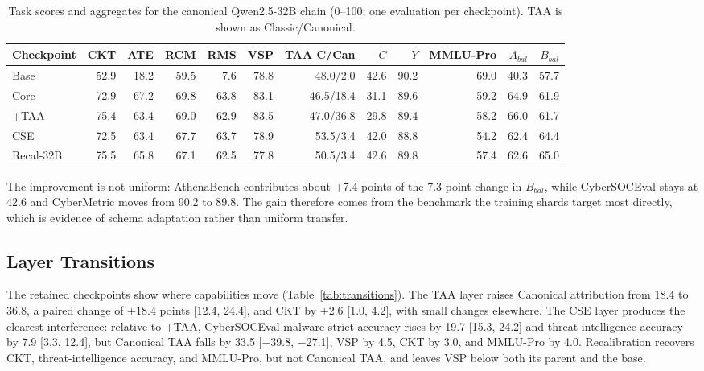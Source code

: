 \documentclass[conference]{IEEEtran}
\begin{document}
\begin{table}[t]
\caption{Task scores and aggregates for the canonical Qwen2.5-32B chain (0--100; one evaluation per checkpoint). TAA is shown as Classic/Canonical.}
\label{tab:mainresults}
\centering
\footnotesize
\setlength{\tabcolsep}{3.0pt}
\begin{tabular}{@{}lrrrrrrrrrrr@{}}
\toprule
Checkpoint & CKT & ATE & RCM & RMS & VSP & TAA C/Can & $C$ & $Y$ & MMLU-Pro & $A_{bal}$ & $B_{bal}$ \\
\midrule
Base & 52.9 & 18.2 & 59.5 & 7.6 & 78.8 & 48.0/2.0 & 42.6 & 90.2 & 69.0 & 40.3 & 57.7 \\
Core & 72.9 & 67.2 & 69.8 & 63.8 & 83.1 & 46.5/18.4 & 31.1 & 89.6 & 59.2 & 64.9 & 61.9 \\
+TAA & 75.4 & 63.4 & 69.0 & 62.9 & 83.5 & 47.0/36.8 & 29.8 & 89.4 & 58.2 & 66.0 & 61.7 \\
CSE & 72.5 & 63.4 & 67.7 & 63.7 & 78.9 & 53.5/3.4 & 42.0 & 88.8 & 54.2 & 62.4 & 64.4 \\
Recal-32B & 75.5 & 65.8 & 67.1 & 62.5 & 77.8 & 50.5/3.4 & 42.6 & 89.8 & 57.4 & 62.6 & 65.0 \\
\bottomrule
\end{tabular}
\end{table}

The improvement is not uniform: AthenaBench contributes about +7.4 points of the 7.3-point change in $B_{bal}$, while CyberSOCEval stays at 42.6 and CyberMetric moves from 90.2 to 89.8. The gain therefore comes from the benchmark the training shards target most directly, which is evidence of schema adaptation rather than uniform transfer.

\subsection{Layer Transitions}
The retained checkpoints show where capabilities move (Table~\ref{tab:transitions}). The TAA layer raises Canonical attribution from 18.4 to 36.8, a paired change of +18.4 points [12.4, 24.4], and CKT by +2.6 [1.0, 4.2], with small changes elsewhere. The CSE layer produces the clearest interference: relative to +TAA, CyberSOCEval malware strict accuracy rises by 19.7 [15.3, 24.2] and threat-intelligence accuracy by 7.9 [3.3, 12.4], but Canonical TAA falls by 33.5 [$-$39.8, $-$27.1], VSP by 4.5, CKT by 3.0, and MMLU-Pro by 4.0. Recalibration recovers CKT, threat-intelligence accuracy, and MMLU-Pro, but not Canonical TAA, and leaves VSP below both its parent and the base.
\end{document}
